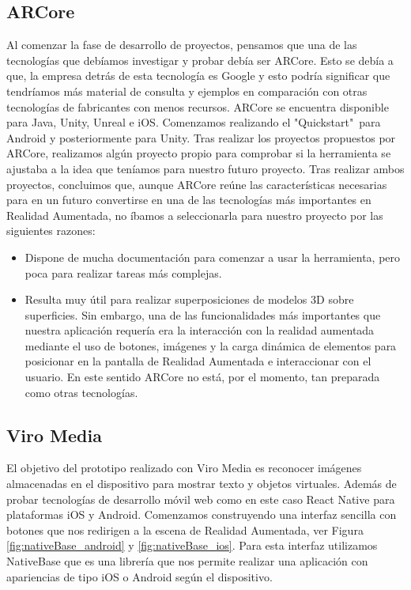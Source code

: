 \subsection{ARCore} 
\label{makereference4.1.1} 
    Al comenzar la fase de desarrollo de proyectos, pensamos que una de las tecnologías que debíamos 
    investigar y probar debía ser ARCore. Esto se debía a que, la empresa detrás de esta 
    tecnología es Google y esto podría significar que tendríamos más material de consulta 
    y ejemplos en comparación con otras tecnologías de fabricantes con menos recursos.
    ARCore se encuentra disponible para Java, Unity, Unreal e iOS. Comenzamos realizando el 
    "Quickstart"\ para Android y posteriormente para Unity. 
    Tras realizar los proyectos propuestos por ARCore, realizamos algún proyecto propio 
    para comprobar si la herramienta se ajustaba a la idea que teníamos para nuestro futuro proyecto.
    Tras realizar ambos proyectos, concluimos que, aunque ARCore reúne las características 
    necesarias para en un futuro convertirse en una de las tecnologías más importantes en Realidad Aumentada, 
    no íbamos a seleccionarla para nuestro proyecto por las siguientes razones:
    \begin{itemize}
        \item Dispone de mucha documentación para comenzar a usar la herramienta, pero poca para realizar tareas más complejas.
        \item Resulta muy útil para realizar superposiciones de modelos 3D sobre superficies. Sin embargo, una de las funcionalidades más importantes que nuestra aplicación requería era la interacción con la realidad aumentada mediante el uso de botones, imágenes y la carga dinámica de elementos para posicionar en la pantalla de Realidad Aumentada e interaccionar con el usuario. En este sentido ARCore no está, por el momento, tan preparada como otras tecnologías.
    \end{itemize}
\subsection{Viro Media} 
\label{makereference4.1.2}

El objetivo del prototipo realizado con Viro Media es reconocer imágenes almacenadas en el dispositivo para mostrar texto y
objetos virtuales. Además de probar tecnologías de desarrollo móvil web como en este caso React Native
para plataformas iOS y Android. Comenzamos construyendo una interfaz sencilla con botones que nos redirigen a la escena de Realidad Aumentada, ver Figura \ref{fig:nativeBase_android} y \ref{fig:nativeBase_ios}.
Para esta interfaz utilizamos NativeBase que es una librería que nos permite
realizar una aplicación con apariencias de tipo iOS o Android según el dispositivo.

